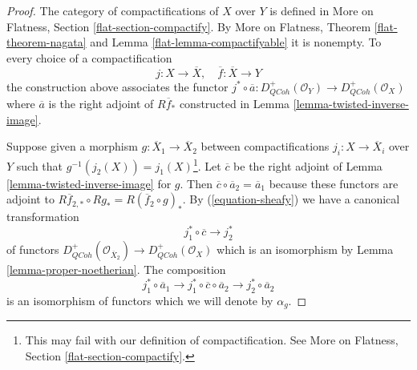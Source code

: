\documentclass{stacks-project}
\theoremstyle{plain}
\theoremstyle{definition}
\theoremstyle{remark}
\numberwithin{equation}{subsection}
\def\QCoh{\mathit{QCoh}}
\begin{document}
\begin{proof}
The category of compactifications of $X$ over $Y$ is defined
in More on Flatness, Section \ref{flat-section-compactify}.
By More on Flatness, Theorem \ref{flat-theorem-nagata} and
Lemma \ref{flat-lemma-compactifyable} it is nonempty.
To every choice of a compactification
$$
j : X \to \overline{X},\quad \overline{f} : \overline{X} \to Y
$$
the construction above associates the functor $j^* \circ \overline{a} :
D_\QCoh^+(\mathcal{O}_Y) \to D_\QCoh^+(\mathcal{O}_X)$
where $\overline{a}$ is the right adjoint of $R\overline{f}_*$
constructed in Lemma \ref{lemma-twisted-inverse-image}.

\medskip\noindent
Suppose given a morphism $g : \overline{X}_1 \to \overline{X}_2$
between compactifications $j_i : X \to \overline{X}_i$ over $Y$
such that $g^{-1}(j_2(X)) = j_1(X)$\footnote{This may fail
with our definition of compactification. See
More on Flatness, Section \ref{flat-section-compactify}.}.
Let $\overline{c}$ be the right adjoint of
Lemma \ref{lemma-twisted-inverse-image} for $g$.
Then $\overline{c} \circ \overline{a}_2 = \overline{a}_1$
because these functors are adjoint to
$R\overline{f}_{2, *} \circ Rg_* = R(\overline{f}_2 \circ g)_*$.
By (\ref{equation-sheafy}) we have a canonical transformation
$$
j_1^* \circ \overline{c} \longrightarrow j_2^*
$$
of functors
$D^+_\QCoh(\mathcal{O}_{\overline{X}_2}) \to D^+_\QCoh(\mathcal{O}_X)$
which is an isomorphism by Lemma \ref{lemma-proper-noetherian}.
The composition
$$
j_1^* \circ \overline{a}_1 \longrightarrow
j_1^* \circ \overline{c} \circ \overline{a}_2 \longrightarrow
j_2^* \circ \overline{a}_2
$$
is an isomorphism of functors which we will denote by $\alpha_g$.


\end{proof}
\end{document}
